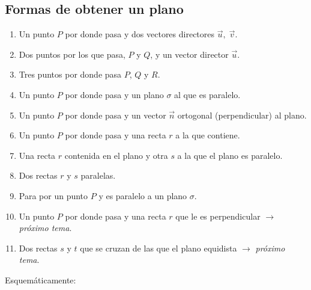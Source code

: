 \subsection{Formas de obtener un plano}

\begin{enumerate}
\item Un punto $P$ por donde pasa y dos vectores directores $\vec u,\; \vec v$.
\item Dos puntos por los que pasa, $P$ y $Q$, y un vector director $\vec u$.
\item Tres puntos por donde pasa $P$, $Q$ y $R$.
\item Un punto $P$ por donde pasa y un plano $\sigma$ al que es paralelo.
\item Un punto $P$ por donde pasa y un vector $\vec n$ ortogonal (perpendicular) al plano.
\item Un punto $P$ por donde pasa y una recta $r$ a la que contiene.	
\item Una recta $r$ contenida en el plano y otra $s$ a la que el plano es paralelo.
\item Dos rectas $r$ y $s$ paralelas.
\item Para por un punto $P$ y es paralelo a un plano $\sigma$.
\item Un punto $P$ por donde pasa y una recta $r$ que le es perpendicular  $\to$ \textit{próximo tema}.

\item Dos rectas $s$ y $t$ que se cruzan de las que el plano equidista  $\to$ \textit{próximo tema}.

\end{enumerate}

Esquemáticamente:

